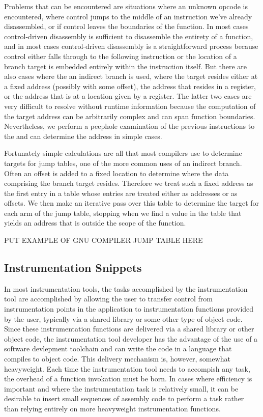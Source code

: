 Problems that can be encountered are situations where an unknown opcode is encountered, where control jumps to the
middle of an instruction we've already disassembled, or if control leaves the boundaries of the function. In most
cases control-driven disassembly is sufficient to disassemble the entirety of a function, and in most cases control-driven
disassembly is a straightforward process because control either falls through to the following instruction 
or the location of a branch target is embedded entirely within the instruction itself. But there are also cases
where the an indirect branch is used, where the target resides either at a fixed address (possibly with some offset), the address that resides in a register,
or the address that is at a location given by a register. The latter two cases are very difficult to resolve
without runtime information because the computation of the target address can be arbitrarily complex and can span function
boundaries. Nevertheless, we perform a peephole examination of the previous instructions to the and can determine 
the address in simple cases.

Fortunately simple calculations are all that most compilers use to determine targets for jump tables, one of the more common
uses of an indirect branch. Often an offset is added to a fixed location to determine where the data comprising the branch target
resides. Therefore we treat such a fixed address as the first entry in a table whose entries are treated either as addresses or as offsets.
We then make an iterative pass over this table to determine the target for each arm of the jump table, stopping when we find a value in the
table that yields an address that is outside the scope of the function.

PUT EXAMPLE OF GNU COMPILER JUMP TABLE HERE

\subsection{Instrumentation Snippets}

In most instrumentation tools, the tasks accomplished by the instrumentation tool are accomplished by allowing the user
to transfer control from instrumentation points in the application to instrumentation functions provided by the user, typically
via a shared library or some other type of object code. Since these instrumentation functions are delivered via a shared library or other
object code, the instrumentation tool developer has the advantage of the use of a software devlepment toolchain and can
write the code in a language that compiles to object code. This delivery mechanism is, however, somewhat heavyweight. Each time
the instrumentation tool needs to accompish any task, the overhead of a function invokation must be born. In cases where
efficiency is important and where the instrumentation task is relatively small, it can be desirable to insert small sequences of assembly code
to perform a task rather than relying entirely on more heavyweight instrumentation functions.

